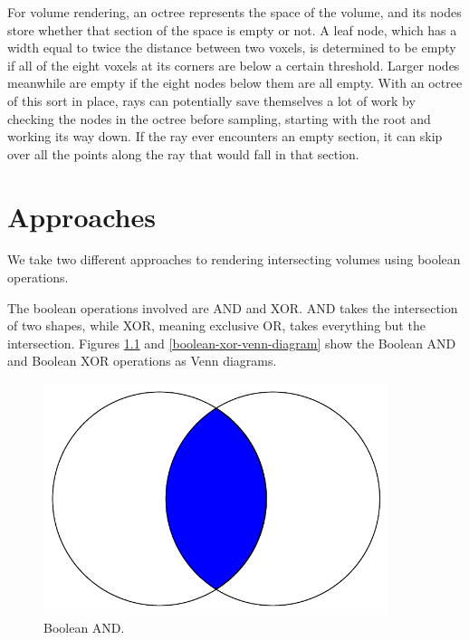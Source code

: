 \documentclass{report}
\begin{document}
For volume rendering, an octree represents the space of the volume, and its
nodes store whether that section of the space is empty or not.  A leaf node,
which has a width equal to twice the distance between two voxels, is determined
to be empty if all of the eight voxels at its corners are below a certain
threshold.  Larger nodes meanwhile are empty if the eight nodes below them are
all empty.  With an octree of this sort in place, rays can potentially save
themselves a lot of work by checking the nodes in the octree before sampling,
starting with the root and working its way down.  If the ray ever encounters an
empty section, it can skip over all the points along the ray that would fall in
that section.

\chapter{Approaches}

We take two different approaches to rendering intersecting volumes using boolean
operations.

The boolean operations involved are AND and XOR.  AND takes the intersection of
two shapes, while XOR, meaning exclusive OR, takes everything but the
intersection.  Figures \ref{boolean-and-venn-diagram} and
\ref{boolean-xor-venn-diagram} show the Boolean AND and Boolean XOR operations
as Venn diagrams.

\begin{figure}
\centering
\includegraphics[width=0.9\textwidth]{venn-and.pdf}
\caption{Boolean AND.}
\label{boolean-and-venn-diagram}
\end{figure}
\end{document}
